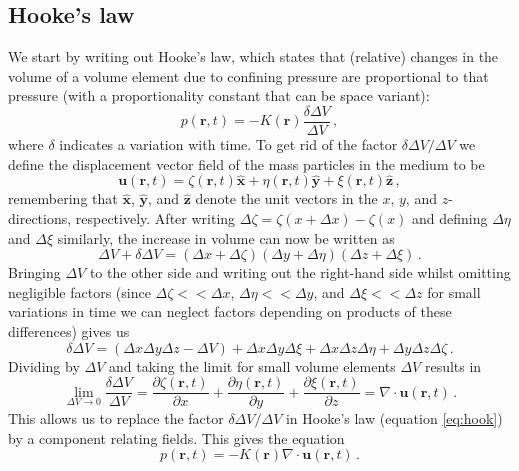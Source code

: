 \subsection{Hooke's law}
We start by writing out Hooke's law, which states that (relative) changes in the volume of a volume element due to confining pressure are proportional to that pressure (with a proportionality constant that can be space variant):
\begin{equation}
    p(\mathbf r, t) = -K(\mathbf r) \frac{\delta \Delta V}{\Delta V} \,, \label{eq:hook}
\end{equation}
where $\delta$ indicates a variation with time.
To get rid of the factor $\delta \Delta V / \Delta V$ we define the displacement vector field of the mass particles in the medium to be
\begin{equation}
    \mathbf u (\mathbf r, t) = \zeta(\mathbf r, t) \mathbf{\hat x} + \eta(\mathbf r, t) \mathbf{\hat y} + \xi(\mathbf r, t) \mathbf{\hat z} \,,\nonumber
\end{equation}
remembering that $\mathbf{\hat x}$, $\mathbf{\hat y}$, and $\mathbf{\hat z}$ denote the unit vectors in the $x$, $y$, and $z$-directions, respectively.
After writing $\Delta \zeta = \zeta(x+\Delta x) - \zeta(x)$ and defining $\Delta \eta$ and $\Delta \xi$ similarly, the increase in volume can now be written as
\begin{equation}
    \Delta V + \delta \Delta V = (\Delta x + \Delta \zeta) (\Delta y + \Delta \eta) (\Delta z + \Delta \xi) \,.\nonumber
\end{equation}
Bringing $\Delta V$ to the other side and writing out the right-hand side whilst omitting negligible factors (since $\Delta \zeta << \Delta x$, $\Delta \eta << \Delta y$, and $\Delta \xi << \Delta z$ for small variations in time we can neglect factors depending on products of these differences) gives us
\begin{equation}
    \delta \Delta V = (\Delta x \Delta y \Delta z - \Delta V) + \Delta x \Delta y \Delta \xi + \Delta x \Delta z \Delta \eta + \Delta y \Delta z \Delta \zeta \,.\nonumber
\end{equation}
Dividing by $\Delta V$ and taking the limit for small volume elements $\Delta V$ results in
\begin{equation}
    \lim_{\Delta V \to 0} \frac{\delta \Delta V}{\Delta V} = \frac{\partial \zeta (\mathbf r, t)}{\partial x} + \frac{\partial \eta (\mathbf r, t)}{\partial y} + \frac{\partial \xi (\mathbf r, t)}{\partial z} = \nabla \cdot \mathbf u (\mathbf r, t) \,.\nonumber
\end{equation}
This allows us to replace the factor $\delta \Delta V / \Delta V$ in Hooke's law (equation \ref{eq:hook}) by a component relating fields. This gives the equation
\begin{equation}
    p(\mathbf r, t) = -K(\mathbf r) \nabla \cdot \mathbf u(\mathbf r, t) \,.\nonumber
\end{equation}

